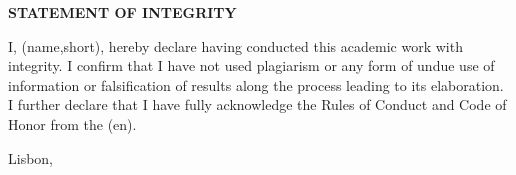 
%

\thispagestyle{empty}

\begingroup
\setlength{\parskip}{1ex plus 1pt minus 1pt}
\setlength{\parindent}{0cm}
\begin{center}
  \textbf{STATEMENT OF INTEGRITY}
\end{center}

I, \thedocauthor(name,short), hereby declare having conducted this academic work with integrity. 
I confirm that I have not used plagiarism or any form of undue use of information or falsification of results along the process leading to its elaboration. 
I further declare that I have fully acknowledge the Rules of Conduct and Code of Honor from the \theschool(en).

\bigskip

Lisbon,
\endgroup
\clearforchapter
